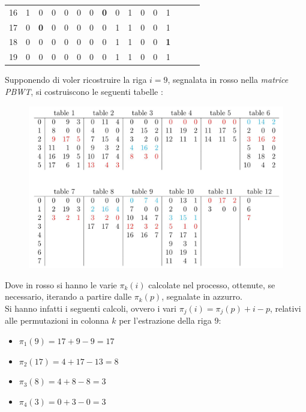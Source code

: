\begin{esempio}
\begin{table}[H]
\begin{tabular}{c|ccccccccccccccc}
      16 & 1 & 0 & 0 & 0 & 0 & 0 & {\color{nordred}\textbf{0}} & 0 & 1 & 0 & 0
                                                               & 1 \\
      17 & 0 & {\color{nordred}\textbf{0}} & 0 & 0 & 0 & 0 & 0 & 1 & 1 & 0 & 0
                                                               & 1 \\
      18 & 0 & 0 & 0 & 0 & 0 & 0 & 0 & 1 & 1 & 0 & 0
                                         & {\color{nordred}\textbf{1}} \\ 
      19 & 0 & 0 & 0 & 0 & 0 & 0 & 0 & 1 & 1 & 0 & 0 & 1 \\
    \end{tabular}
  \end{table}
  Supponendo di voler ricostruire la riga $i=9$, segnalata in rosso nella
  \textit{matrice PBWT}, si costruiscono le seguenti
  tabelle \cite{tricks}:
   \begin{figure}[H]
    \centering
    \includegraphics[width=\textwidth]{img/trick.jpg}
  \end{figure}
  Dove in rosso si hanno le varie $\pi_k(i)$ calcolate nel processo, ottenute,
  se necessario, iterando a partire dalle $\pi_k(p)$, segnalate in azzurro. \\
  Si hanno infatti i seguenti calcoli, ovvero i vari $\pi_j(i)=\pi_j(p)+i-p$,
  relativi alle permutazioni in colonna $k$ per l'estrazione della riga $9$:
  \begin{multicols}{2}
    \begin{itemize}
      \item $\pi_1(9)=17+9-9=17$
      \item $\pi_2(17)=4+17-13=8$
      \item $\pi_3(8)=4+8-8=3$
      \item $\pi_4(3)=0+3-0=3$

\end{itemize}
\end{multicols}
\end{esempio}
